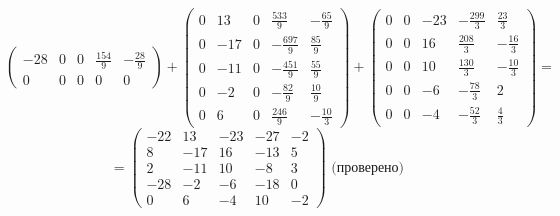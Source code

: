 \documentclass[a4paper]{article}
\begin{document}
\begin{enumerate}
$$\begin{pmatrix}
        -28 & 0 & 0 & \frac{154}{9} & -\frac{28}{9} \\
        0 & 0 & 0 & 0 & 0
        \end{pmatrix}+
        \begin{pmatrix}
            0 & 13 & 0 & \frac{533}{9} & -\frac{65}{9} \\
            0 & -17 & 0 & -\frac{697}{9} & \frac{85}{9} \\
            0 & -11 & 0 & -\frac{451}{9} & \frac{55}{9} \\
            0 & -2 & 0 & -\frac{82}{9} & \frac{10}{9} \\
            0 & 6 & 0 & \frac{246}{9} & -\frac{10}{3}
            \end{pmatrix}+
    \begin{pmatrix}
        0 & 0 & -23 & -\frac{299}{3} & \frac{23}{3} \\
        0 & 0 & 16 & \frac{208}{3} & -\frac{16}{3} \\
        0 & 0 & 10 & \frac{130}{3} & -\frac{10}{3} \\
        0 & 0 & -6 & -\frac{78}{3} & 2 \\
        0 & 0 & -4 & -\frac{52}{3} & \frac{4}{3}
        \end{pmatrix} = $$
    $$= \begin{pmatrix}
        -22 & 13 & -23 & -27 & -2 \\
        8 & -17 & 16 & -13 & 5 \\
        2 & -11 & 10 & -8 & 3 \\
        -28 & -2 & -6 & -18 & 0 \\
        0 & 6 & -4 & 10 & -2
        \end{pmatrix} \text{ (проверено)}$$\\


\end{enumerate}
\end{document}
